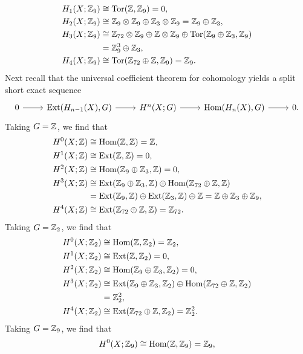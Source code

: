 \documentclass{../mathnotes}
\begin{document}
\begin{enumerate}
\begin{align*}
            H_1(X;\Z_9) &\cong \Tor(\Z,\Z_9)=0,\\
            H_2(X;\Z_9) &\cong \Z_9\otimes\Z_9\oplus\Z_3\otimes\Z_9=\Z_9\oplus\Z_3,\\
            H_3(X;\Z_9) &\cong \Z_{72}\otimes\Z_9\oplus\Z\otimes\Z_9\oplus\Tor(\Z_9\oplus\Z_3,\Z_9)\\
                        &= \Z_9^3\oplus\Z_3,\\
            H_4(X;\Z_9) &\cong \Tor(\Z_{72}\oplus\Z,\Z_9)=\Z_9.
        \end{align*}
        Next recall that the universal coefficient theorem for cohomology yields 
        a split short exact sequence
        \begin{equation*}
            \begin{tikzcd}
                0\ar{r}& \Ext(H_{n-1}(X),G)\ar{r}& H^n(X;G)\ar{r}& \Hom(H_n(X),G)\ar{r}& 0.
            \end{tikzcd}
        \end{equation*}
        Taking $G=\Z$, we find that
        \begin{align*}
            H^0(X;\Z) &\cong \Hom(\Z,\Z)=\Z,\\
            H^1(X;\Z) &\cong \Ext(\Z,\Z)=0,\\
            H^2(X;\Z) &\cong \Hom(\Z_9\oplus\Z_3,\Z)=0,\\
            H^3(X;\Z) &\cong \Ext(\Z_9\oplus\Z_3,\Z)\oplus\Hom(\Z_{72}\oplus\Z,\Z)\\
            &= \Ext(\Z_9,\Z)\oplus\Ext(\Z_3,\Z)\oplus\Z=\Z\oplus\Z_3\oplus\Z_9,\\
            H^4(X;\Z) &\cong\Ext(\Z_{72}\oplus\Z,\Z)=\Z_{72}.
        \end{align*}
        Taking $G=\Z_2$, we find that
        \begin{align*}
            H^0(X;\Z_2) &\cong\Hom(\Z,\Z_2)=\Z_2,\\
            H^1(X;\Z_2) &\cong\Ext(\Z,\Z_2)=0,\\
            H^2(X;\Z_2) &\cong\Hom(\Z_9\oplus\Z_3,\Z_2)=0,\\
            H^3(X;\Z_2) &\cong\Ext(\Z_9\oplus\Z_3,\Z_2)\oplus\Hom(\Z_{72}\oplus\Z,\Z_2)\\
            &=\Z_2^2,\\
            H^4(X;\Z_2) &\cong\Ext(\Z_{72}\oplus\Z,\Z_2)=\Z_2^2.
        \end{align*}
        Taking $G=\Z_9$, we find that
        \begin{align*}
            H^0(X;\Z_9) &\cong\Hom(\Z,\Z_9)=\Z_9,\\

\end{align*}
\end{enumerate}
\end{document}
